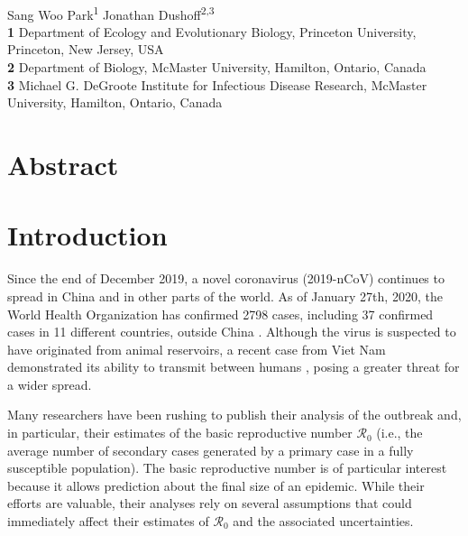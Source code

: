 \documentclass[12pt]{article}
\date{\today}
\begin{document}
\begin{flushleft}{
	\Large
	\textbf{}
}
\newline
\\
Sang Woo Park\textsuperscript{1}
Jonathan Dushoff\textsuperscript{2,3}
\\

\bigskip
\textbf{1} Department of Ecology and Evolutionary Biology, Princeton University, Princeton, New Jersey, USA
\\
\textbf{2} Department of Biology, McMaster University, Hamilton, Ontario, Canada
\\
\textbf{3} Michael G. DeGroote Institute for Infectious Disease Research, McMaster University, Hamilton, Ontario, Canada
\\
\bigskip

\end{flushleft}

\section*{Abstract}

\pagebreak

\section{Introduction}

Since the end of December 2019, a novel coronavirus (2019-nCoV) continues to
spread in China and in other parts of the world.
As of January 27th, 2020, the World Health Organization has
confirmed 2798 cases, including 37 confirmed cases in 11 different
countries, outside China \citep{who27report}.
Although the virus is suspected to have originated
from animal reservoirs, a recent case from Viet Nam
demonstrated its ability to transmit between
humans \citep{who26report},
posing a greater threat for a wider spread.

Many researchers have been rushing to publish their 
analysis of the outbreak \citep{imaincov, riouncov,readncov,zhaoncov,majumderncov,liuncov} 
and, in particular, their
estimates of the basic 
reproductive number $\mathcal R_0$ (i.e., the 
average number of secondary cases generated 
by a primary case in a fully susceptible population).
The basic reproductive number is of particular interest 
because it allows prediction about the final size of an epidemic.
While their efforts are valuable, their analyses rely on several
assumptions that could immediately affect their estimates of $\mathcal R_0$ and
the associated uncertainties.
\end{document}
